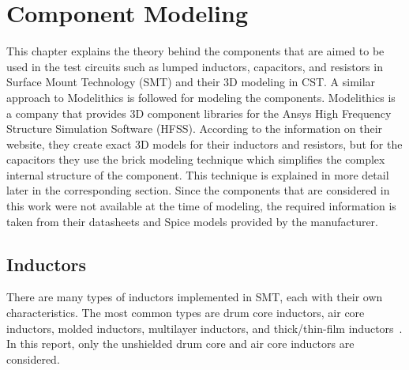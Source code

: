 \chapter{Component Modeling} \label{chap:two}
This chapter explains the theory behind the components that are aimed to be used in the test circuits such as lumped inductors, capacitors, and resistors in Surface Mount Technology (SMT) and their 3D modeling in CST. A similar approach to Modelithics is followed for modeling the components. Modelithics is a company that provides 3D component libraries for the Ansys High Frequency Structure Simulation Software (HFSS). According to the information on their website, they create exact 3D models for their inductors and resistors, but for the capacitors they use the brick modeling technique which simplifies the complex internal structure of the component. This technique is explained in more detail later in the corresponding section. Since the components that are considered in this work were not available at the time of modeling, the required information is taken from their datasheets and Spice models provided by the manufacturer. 

\section{Inductors}
There are many types of inductors implemented in SMT, each with their own characteristics. The most common types are drum core inductors, air core inductors, molded inductors, multilayer inductors, and thick/thin-film inductors~\cite{digikey}. In this report, only the unshielded drum core and air core inductors are considered. 

